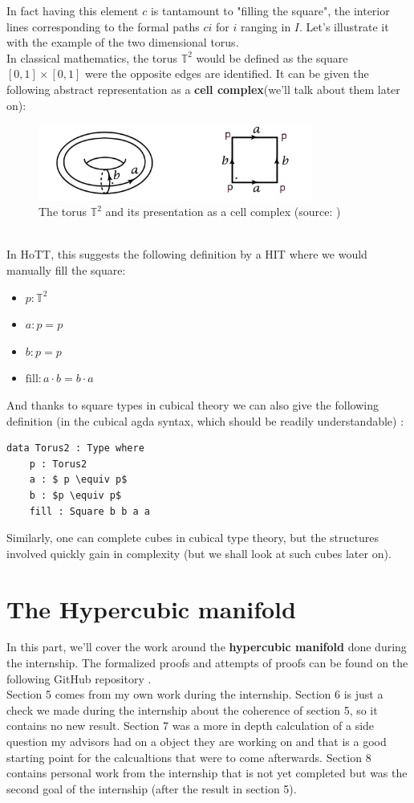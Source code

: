 \documentclass{report}
\begin{document}
In fact having this element $c$ is tantamount to "filling the square", the interior lines corresponding to the formal paths $c i$ for $i$ ranging in $I$. Let's illustrate it with the example of the two dimensional torus.\\ 
In classical mathematics, the torus $\mathbb{T}^2$ would be defined as the square $[0,1]\times[0,1]$ were the opposite edges are identified. It can be given the following abstract representation as a \textbf{cell complex}(we'll talk about them  later on):
\begin{figure}[h]
  \begin{center}
    \includegraphics[height= 2.5cm]{torus.png}
    \caption{The torus $\mathbb{T}^2$ and its presentation as a cell complex (source: \cite{hatcher})}
    \label{fig:torus}
  \end{center}
\end{figure}
\\
In HoTT, this suggests the following definition by a HIT where we would manually fill the square:
\begin{itemize}
  \item $ p : \mathbb{T}^2$
  \item $a : p = p$
  \item $b : p = p $
  \item $\mathrm{fill} :  a \cdot b = b \cdot a$
\end{itemize}
And thanks to square types in cubical theory we can also give the following definition (in the cubical agda syntax, which should be readily understandable) : 
\begin{lstlisting}[mathescape=true]
    data Torus2 : Type where
    p : Torus2
    a : $ p \equiv p$
    b : $p \equiv p$
    fill : Square b b a a
\end{lstlisting}
Similarly, one can complete cubes in cubical type theory, but the structures involved quickly gain in complexity (but we shall look at such cubes later on).
\chapter{The Hypercubic manifold} 
In this part, we'll cover the work around the \textbf{hypercubic manifold} done during the internship. The formalized proofs and attempts of proofs can be found on the following GitHub repository \cite{repo}. \\
Section 5 comes from my own work during the internship. Section 6 is just a check we made during the internship about the coherence of section 5, so it contains no new result. Section 7 was a more in depth calculation of a side question my advisors had on a object they are working on and that is a good starting point for the calcualtions that were to come afterwards. Section 8 contains personal work from the internship that is not yet completed but was the second goal of the internship (after the result in section 5).
\end{document}
